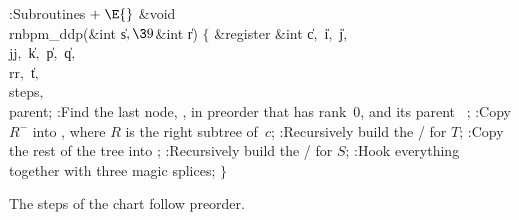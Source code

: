 \Y\B\4:Subroutines\X${}\mathrel+\E{}$\6
\&{void} \\{rnbpm\_ddp}(\&{int} \|s${},\39{}$\&{int} \|r)\1\1\2\2\6
${}\{{}$\1\6
\&{register} \&{int} \|c${},{}$ \|i${},{}$ \|j${},{}$ \\{jj}${},{}$ \|k${},{}$ %
\|p${},{}$ \|q${},{}$ \\{rr}${},{}$ \|t${},{}$ \\{steps}${},{}$ \\{parent};\7
:Find the last node, , in preorder that has rank~0, and its parent~%
\X;\6
:Copy $R^-$ into , where $R$ is the right
subtree of~$c$\X;\6
:Recursively build the \RNBPM/ for $T$\X;\6
:Copy the rest of the tree into \X;\6
:Recursively build the \RNBPM/ for $S$\X;\6
:Hook everything together with three magic splices\X;\6
\4${}\}{}$\2\par
\fi

The steps of the chart follow preorder.

